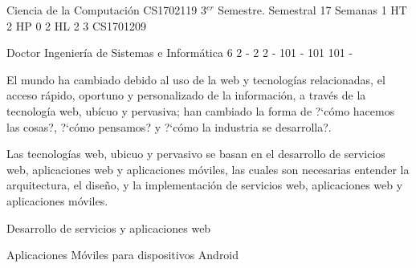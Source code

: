 \documentclass[a4paper,8pt]{article}
\begin{document}
\setNombreProfesor{}
\setGradoProfesorAbreviado{}
\sylabusHeader

\academicaTable
{Ciencia de la Computación} %
{CS1702119} %
{3$^{er}$ Semestre.} %
{Semestral} %
{17 Semanas} %
{1 HT} %
{2 HP} %
{0} %
{2 HL}  %
{2} %
{3} %
{CS1701209} %

\administrativaTable
{Doctor} %
{Ingeniería de Sistemas e Informática} %
{6} %
{2} %
{-} %
{2} %
{2} %
{-} %
{101} %
{-} %
{101} %
{101} %
{-} %


\begin{fundamentacion}
El mundo ha cambiado debido al uso de la web y tecnologías relacionadas, el acceso rápido, oportuno y personalizado de la
información, a través de la tecnología web, ubícuo  y pervasiva; han cambiado la forma de ?`cómo hacemos las cosas?, ?`cómo pensamos? y ?`cómo la industria se desarrolla?.

Las tecnologías web, ubicuo  y pervasivo se basan en el desarrollo de servicios web, aplicaciones web y aplicaciones móviles,
las cuales son necesarias entender la arquitectura, el diseño, y la implementación de servicios web, aplicaciones web y aplicaciones móviles.

\end{fundamentacion}

\begin{sumilla}
\item \PBDIntroduction
\item \PBDWebPlatforms
\item Desarrollo de servicios y aplicaciones web
\item \PBDMobilePlatforms
\item Aplicaciones Móviles para dispositivos Android

\end{sumilla}

\begin{competenciasAsignatura}
\item {}
\item {}
\item {}

\end{competenciasAsignatura}
\end{document}
